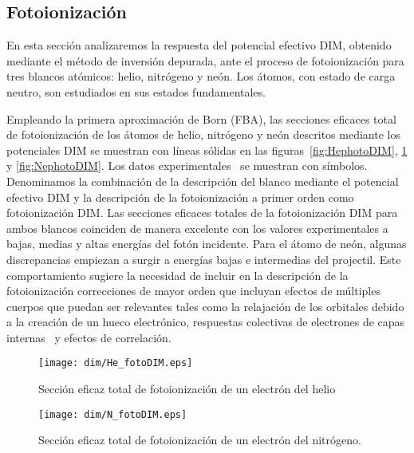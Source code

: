\subsection{Fotoionización}
\label{subsec:foto}

En esta sección analizaremos la respuesta del potencial efectivo DIM, 
obtenido mediante el método de inversión depurada, ante el proceso de
fotoionización para tres blancos atómicos: helio, nitrógeno y neón. 
Los átomos, con estado de carga neutro, son estudiados en sus estados
fundamentales.

Empleando la primera aproximación de Born (FBA), las secciones eficaces
total de fotoionización de los átomos de helio, nitrógeno y neón descritos 
mediante los potenciales DIM se muestran con líneas sólidas en las 
figuras~\ref{fig:HephotoDIM}, \ref{fig:NphotoDIM} y \ref{fig:NephotoDIM}.
Los datos experimentales~\cite{Henke:93,Samson:90,Samson:02,Stolte:16} 
se muestran con símbolos. Denominamos la combinación de la 
descripción del blanco mediante el potencial efectivo DIM y la descripción 
de la fotoionización a primer orden como fotoionización DIM. 
Las secciones eficaces totales de la fotoionización DIM para ambos 
blancos coinciden de manera excelente con los valores experimentales
a bajas, medias y altas energías del fotón incidente. Para el átomo de
neón, algunas discrepancias empiezan a surgir a energías bajas e 
intermedias del projectil. Este comportamiento sugiere la necesidad de 
incluir en la descripción de la fotoionización correcciones de mayor 
orden que incluyan efectos de múltiples cuerpos que puedan ser 
relevantes tales como la relajación de los orbitales debido a la 
creación de un hueco electrónico, respuestas colectivas de electrones 
de capas internas~\cite{Ederer:64} y efectos de correlación.

\begin{figure}
\centering
 \texttt{[image: dim/He\_fotoDIM.eps]}
\caption[Fotoionización de helio.]
{Sección eficaz total de fotoionización de un electrón del helio}
\label{fig:HephotoDIM}
\vspace{0.5cm}
 \texttt{[image: dim/N\_fotoDIM.eps]}
\caption[Fotoionización de nitrógeno.]
{Sección eficaz total de fotoionización de un electrón del 
nitrógeno.}
\label{fig:NphotoDIM}
\end{figure}

